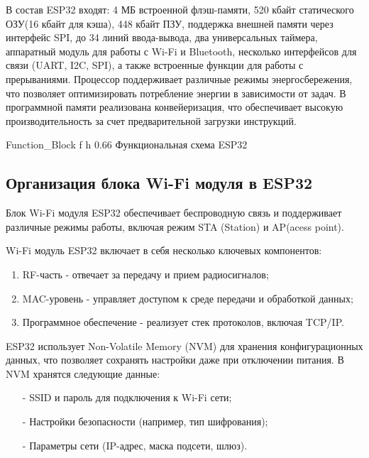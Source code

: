 \documentclass{bmstu}
\begin{document}
    В состав ESP32 входят: 4 МБ встроенной флэш-памяти, 520 кбайт статического ОЗУ(16 кбайт для кэша), 448 кбайт ПЗУ, поддержка внешней памяти через интерфейс SPI, до 34 линий ввода-вывода, два универсальных таймера, аппаратный модуль для работы с Wi-Fi и Bluetooth, несколько интерфейсов для связи (UART, I2C, SPI), а также встроенные функции для работы с прерываниями. Процессор поддерживает различные режимы энергосбережения, что позволяет оптимизировать потребление энергии в зависимости от задач. В программной памяти реализована конвейеризация, что обеспечивает высокую производительность за счет предварительной загрузки инструкций.

    {Function_Block} %
    {f} %
    {h} %
    {0.66\textwidth} %
    {Функциональная схема ESP32} %

    \subsection{Организация блока Wi-Fi модуля в ESP32}

    Блок Wi-Fi модуля ESP32 обеспечивает беспроводную связь и поддерживает различные режимы работы, включая режим STA (Station) и AP(acess point).

    Wi-Fi модуль ESP32 включает в себя несколько ключевых компонентов:
    \begin{enumerate}
        \item RF-часть - отвечает за передачу и прием радиосигналов;
        \item MAC-уровень - управляет доступом к среде передачи и обработкой данных;
        \item Программное обеспечение - реализует стек протоколов, включая TCP/IP.
    \end{enumerate}

    ESP32 использует Non-Volatile Memory (NVM) для хранения конфигурационных данных, что позволяет сохранять настройки даже при отключении питания. В NVM хранятся следующие данные:
    \begin{itemize}
        \item[-] SSID и пароль для подключения к Wi-Fi сети;
        \item[-] Настройки безопасности (например, тип шифрования);
        \item[-] Параметры сети (IP-адрес, маска подсети, шлюз).
    \end{itemize}
\end{document}

